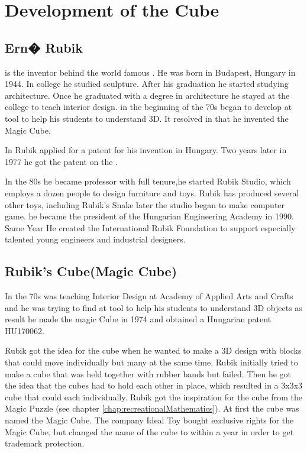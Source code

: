 \chapter{Development of the Cube}
\section{Ern� Rubik}
\erno{} is the inventor behind the world famous \rubik{}. He was born in Budapest, Hungary in 1944.  In college he studied sculpture. After his graduation he started studying architecture.  Once he graduated with a degree in architecture he stayed at the college to teach interior design. in the beginning of the 70s began to develop at tool to help his students to understand 3D. It resolved in that he invented the Magic Cube.

In  Rubik applied for a patent for his invention in Hungary. Two years later in 1977 he got the patent on the \rubik{}.


In the 80s he became professor with full tenure,he started Rubik Studio, which employs a dozen people to design furniture and toys. Rubik has produced several other toys, including Rubik's Snake later the studio began to make computer game. he became the president of the Hungarian Engineering Academy in 1990. Same Year He created the International Rubik Foundation to support especially talented young engineers and industrial designers.
 
\section{Rubik's Cube(Magic Cube)}

 In the 70s \erno{} was teaching Interior Design at Academy of Applied Arts and Crafts and he was trying to find at tool to help his students to understand 3D objects as result he made the magic Cube in 1974 and obtained a Hungarian patent HU170062. 
 
 Rubik got the idea for the cube when he wanted to make a 3D design with blocks that could move individually but many at the same time. Rubik initially tried  to make a cube that was held together with rubber bands but failed. Then he got the idea that the cubes had to hold each other in place, which resulted in a 3x3x3 cube that could \twist{} each \face{} individually. Rubik got the inspiration for the cube from the Magic Puzzle (see chapter \ref{chap:recreationalMathematics}). At first the cube was named the Magic Cube. The company Ideal Toy bought exclusive rights for the Magic Cube, but changed the name of the cube to \rubik{} within a year in order to get trademark protection.

